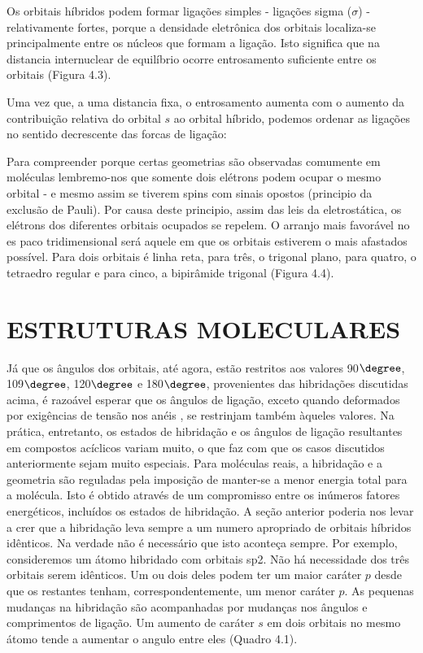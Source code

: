 Os orbitais híbridos podem formar ligações simples - ligações sigma ($\sigma$) - relativamente fortes, porque a densidade eletrônica dos orbitais localiza-se principalmente entre os núcleos que formam a ligação. Isto significa que na distancia internuclear de equilíbrio ocorre entrosamento suficiente entre os orbitais (Figura 4.3).

Uma vez que, a uma distancia fixa, o entrosamento aumenta com o aumento da contribuição relativa do orbital $s$ ao orbital híbrido, podemos ordenar as ligações no sentido decrescente das forcas de ligação:

Para compreender porque certas geometrias são observadas comumente em moléculas lembremo-nos que somente dois elétrons podem ocupar o mesmo orbital - e mesmo assim se tiverem spins com sinais opostos (principio da exclusão de Pauli). Por causa deste principio, assim das leis da eletrostática, os elétrons dos diferentes orbitais ocupados se repelem. O arranjo mais favorável no es paco tridimensional será aquele em que os orbitais estiverem o mais afastados possível. Para dois orbitais é linha reta, para três, o trigonal plano, para quatro, o tetraedro regular e para cinco, a bipirâmide trigonal (Figura 4.4).

\section{ESTRUTURAS MOLECULARES}

Já que os ângulos dos orbitais, até agora, estão restritos aos valores 90$\degree$, 109$\degree$, 120$\degree$ e 180$\degree$, provenientes das hibridações discutidas acima, é razoável esperar que os ângulos de ligação, exceto quando deformados por exigências de tensão nos anéis , se restrinjam também àqueles valores. Na prática, entretanto, os estados de hibridação e os ângulos de ligação resultantes em compostos acíclicos variam muito, o que faz com que os casos discutidos anteriormente sejam muito especiais. Para moléculas reais, a hibridação e a geometria são reguladas pela imposição de manter-se a menor energia total para a molécula. Isto é obtido através de um compromisso entre os inúmeros fatores energéticos, incluídos os estados de hibridação. A seção anterior poderia nos levar a crer que a hibridação leva sempre a um numero apropriado de orbitais híbridos idênticos. Na verdade não é necessário que isto aconteça sempre. Por exemplo, consideremos um átomo hibridado com orbitais sp2. Não há necessidade dos três orbitais serem idênticos. Um ou dois deles podem ter um maior caráter $p$ desde que os restantes tenham, correspondentemente, um menor caráter $p$. As pequenas mudanças na hibridação são acompanhadas por mudanças nos ângulos e comprimentos de ligação. Um aumento de caráter $s$ em dois orbitais no mesmo átomo tende a aumentar o angulo entre eles (Quadro 4.1).

